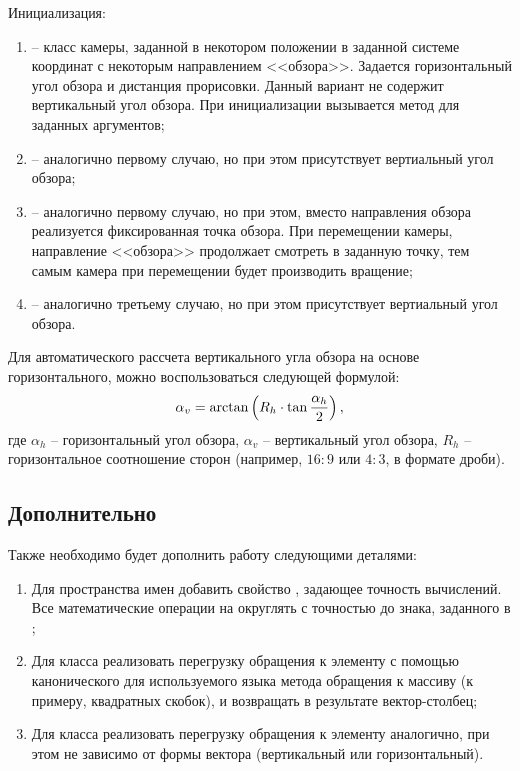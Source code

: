 	\noindent Инициализация:
	\begin{enumerate}
		\item {} -- класс камеры, заданной в некотором положении в заданной системе координат с некоторым направлением <<обзора>>. Задается горизонтальный угол обзора и дистанция прорисовки. Данный вариант не содержит вертикальный угол обзора. При инициализации вызывается метод  для заданных аргументов;
		\item {} -- аналогично первому случаю, но при этом присутствует вертиальный угол обзора;
		\item {} -- аналогично первому случаю, но при этом, вместо направления обзора реализуется фиксированная точка обзора. При перемещении камеры, направление <<обзора>> продолжает смотреть в заданную точку, тем самым камера при перемещении будет производить вращение;
		\item {} -- аналогично третьему случаю, но при этом присутствует вертиальный угол обзора.
	\end{enumerate}

	Для автоматического рассчета вертикального угла обзора на основе горизонтального, можно воспользоваться следующей формулой:
	\[ \alpha_{v} = \arctan\left(  R_h \cdot \tan{\frac{\alpha_h}{2}} \right), \]
	где $\alpha_h$ -- горизонтальный угол обзора, $\alpha_v$ -- вертикальный угол обзора, $R_h$ -- горизонтальное соотношение сторон (например, $16:9$ или $4:3$, в формате дроби).


\subsection{Дополнительно}

	Также необходимо будет дополнить работу следующими деталями:

	\begin{enumerate}
		\item Для пространства имен  добавить свойство , задающее точность вычислений. Все математические операции на  округлять с точностью до знака, заданного в ;
		\item Для класса  реализовать перегрузку обращения к элементу с помощью канонического для используемого языка метода обращения к массиву (к примеру, квадратных скобок), и возвращать в результате вектор-столбец;
		\item Для класса  реализовать перегрузку обращения к элементу аналогично, при этом не зависимо от формы вектора (вертикальный или горизонтальный).
	\end{enumerate}


